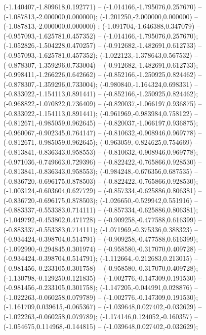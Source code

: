  (-1.140407,-1.809618,0.192771) -- (-1.014166,-1.795076,0.257670) -- (-1.087813,-2.000000,0.000000);
 (-1.201250,-2.000000,0.000000) -- (-1.087813,-2.000000,0.000000) ;
 (-1.091704,-1.646388,0.347079) -- (-0.957093,-1.625781,0.457352) -- (-1.014166,-1.795076,0.257670);
 (-1.052826,-1.504228,0.470257) -- (-0.912682,-1.482691,0.612733) -- (-0.957093,-1.625781,0.457352);
 (-1.022123,-1.378643,0.567532) -- (-0.878307,-1.359296,0.733004) -- (-0.912682,-1.482691,0.612733);
 (-0.998411,-1.266226,0.642662) -- (-0.852166,-1.250925,0.824462) -- (-0.878307,-1.359296,0.733004);
 (-0.980840,-1.164324,0.698331) -- (-0.833022,-1.154113,0.891441) -- (-0.852166,-1.250925,0.824462);
 (-0.968822,-1.070822,0.736409) -- (-0.820037,-1.066197,0.936875) -- (-0.833022,-1.154113,0.891441);
 (-0.961969,-0.983984,0.758122) -- (-0.812671,-0.985059,0.962645) -- (-0.820037,-1.066197,0.936875);
 (-0.960067,-0.902345,0.764147) -- (-0.810632,-0.908946,0.969778) -- (-0.812671,-0.985059,0.962645);
 (-0.963059,-0.824625,0.754669) -- (-0.813841,-0.836343,0.958553) -- (-0.810632,-0.908946,0.969778);
 (-0.971036,-0.749663,0.729396) -- (-0.822422,-0.765866,0.928530) -- (-0.813841,-0.836343,0.958553);
 (-0.984248,-0.676356,0.687535) -- (-0.836720,-0.696175,0.878503) -- (-0.822422,-0.765866,0.928530);
 (-1.003124,-0.603604,0.627729) -- (-0.857334,-0.625886,0.806381) -- (-0.836720,-0.696175,0.878503);
 (-1.026650,-0.529942,0.551916) -- (-0.883337,-0.553383,0.714111) -- (-0.857334,-0.625886,0.806381);
 (-1.049792,-0.453802,0.471728) -- (-0.909258,-0.477588,0.616399) -- (-0.883337,-0.553383,0.714111);
 (-1.071969,-0.375336,0.388323) -- (-0.934424,-0.398704,0.514791) -- (-0.909258,-0.477588,0.616399);
 (-1.092990,-0.294845,0.301974) -- (-0.958580,-0.317070,0.409728) -- (-0.934424,-0.398704,0.514791);
 (-1.112664,-0.212683,0.213015) -- (-0.981456,-0.233105,0.301758) -- (-0.958580,-0.317070,0.409728);
 (-1.130798,-0.129250,0.121835) -- (-1.002776,-0.147309,0.191530) -- (-0.981456,-0.233105,0.301758);
 (-1.147205,-0.044991,0.028876) -- (-1.022263,-0.060258,0.079789) -- (-1.002776,-0.147309,0.191530);
 (-1.161709,0.039615,-0.065367) -- (-1.039648,0.027402,-0.032629) -- (-1.022263,-0.060258,0.079789);
 (-1.174146,0.124052,-0.160357) -- (-1.054675,0.114968,-0.144815) -- (-1.039648,0.027402,-0.032629);
